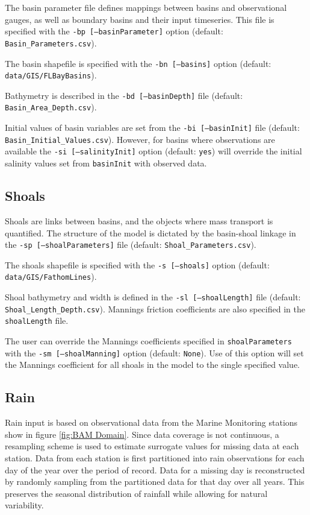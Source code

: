 The basin parameter file defines mappings between basins and observational gauges, as well as boundary basins and their input timeseries. This file is specified with the \texttt{-bp [--basinParameter]} option (default: \texttt{Basin\_Parameters.csv}).

The basin shapefile is specified with the \texttt{-bn [--basins]} option (default: \texttt{data/GIS/FLBayBasins}).

Bathymetry is described in the \texttt{-bd [--basinDepth]} file (default: \texttt{Basin\_Area\_Depth.csv}).  

Initial values of basin variables are set from the \texttt{-bi [--basinInit]} file (default: \texttt{Basin\_Initial\_Values.csv}).  However, for basins where observations are available the \texttt{-si [--salinityInit]} option (default: \texttt{yes}) will override the initial salinity values set from \texttt{basinInit} with observed data.

\subsection{Shoals}
\label{sec:Input Shoals}
Shoals are links between basins, and the objects where mass transport is quantified.  The structure of the model is dictated by the basin-shoal linkage in the \texttt{-sp [--shoalParameters]} file (default: \texttt{Shoal\_Parameters.csv}).  

The shoals shapefile is specified with the \texttt{-s [--shoals]} option (default: \texttt{data/GIS/FathomLines}). 

Shoal bathymetry and width is defined in the \texttt{-sl [--shoalLength]} file (default: \texttt{Shoal\_Length\_Depth.csv}). Mannings friction coefficients are also specified in the \texttt{shoalLength} file.

The user can override the Mannings coefficients specified in \texttt{shoalParameters} with the \texttt{-sm [--shoalManning]} option (default: \texttt{None}).  Use of this option will set the Mannings coefficient for all shoals in the model to the single specified value. 

\subsection{Rain}
\label{sec:Input Data Rain}
Rain input is based on observational data from the Marine Monitoring stations show in figure \ref{fig:BAM Domain}.  Since data coverage is not continuous, a resampling scheme is used to estimate surrogate values for missing data at each station.  Data from each station is first partitioned into rain observations for each day of the year over the period of record.  Data for a missing day is reconstructed by randomly sampling from the partitioned data for that day over all years.  This preserves the seasonal distribution of rainfall while allowing for natural variability.

